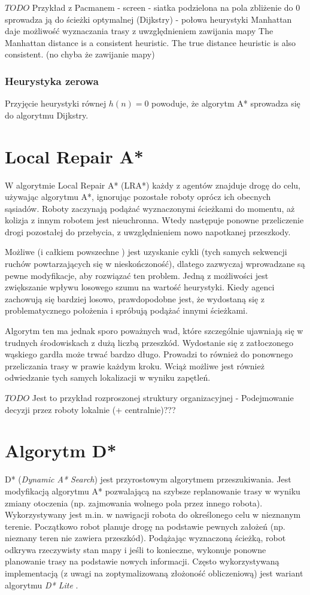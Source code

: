 $TODO$ Przykład z Pacmanem - screen - siatka podzielona na pola
zbliżenie do 0 sprowadza ją do ścieżki optymalnej (Dijkstry) - połowa heurystyki Manhattan daje możliwość wyznaczania trasy z uwzględnieniem zawijania mapy
The Manhattan distance is a consistent heuristic. The true distance heuristic is also consistent. (no chyba że zawijanie mapy)

\subsubsection{Heurystyka zerowa}
Przyjęcie heurystyki równej $h(n) = 0$ powoduje, że algorytm A* sprowadza się do algorytmu Dijkstry.

\section{Local Repair A*}
\label{ch:lra}
W algorytmie Local Repair A* (LRA*) każdy z agentów znajduje drogę do celu, używając algorytmu A*, ignorując pozostałe roboty oprócz ich obecnych sąsiadów. Roboty zaczynają podążać wyznaczonymi ścieżkami do momentu, aż kolizja z innym robotem jest nieuchronna. Wtedy następuje ponowne przeliczenie drogi pozostałej do przebycia, z uwzględnieniem nowo napotkanej przeszkody.

Możliwe (i całkiem powszechne \cite{cooppath}) jest uzyskanie cykli (tych samych sekwencji ruchów powtarzających się w nieskończoność), dlatego zazwyczaj wprowadzane są pewne modyfikacje, aby rozwiązać ten problem. Jedną z możliwości jest zwiększanie wpływu losowego szumu na wartość heurystyki. Kiedy agenci zachowują się bardziej losowo, prawdopodobne jest, że wydostaną się z problematycznego położenia i spróbują podążać innymi ścieżkami.

Algorytm ten ma jednak sporo poważnych wad, które szczególnie ujawniają się w trudnych środowiskach z dużą liczbą przeszkód. Wydostanie się z zatłoczonego wąskiego gardła może trwać bardzo długo. Prowadzi to również do ponownego przeliczania trasy w prawie każdym kroku. Wciąż możliwe jest również odwiedzanie tych samych lokalizacji w wyniku zapętleń.

$TODO$ Jest to przykład rozproszonej struktury organizacyjnej - Podejmowanie decyzji przez roboty lokalnie (+ centralnie)???

\section{Algorytm D*}
\label{ch:dstar}
D* ({\it Dynamic A* Search}) jest przyrostowym algorytmem przeszukiwania. Jest modyfikacją algorytmu A* pozwalającą na szybsze replanowanie trasy w wyniku zmiany otoczenia (np. zajmowania wolnego pola przez innego robota). Wykorzystywany jest m.in. w nawigacji robota do określonego celu w nieznanym terenie. Początkowo robot planuje drogę na podstawie pewnych założeń (np. nieznany teren nie zawiera przeszkód). Podążając wyznaczoną ścieżką, robot odkrywa rzeczywisty stan mapy i jeśli to konieczne, wykonuje ponowne planowanie trasy na podstawie nowych informacji.
Często wykorzystywaną implementacją (z uwagi na zoptymalizowaną złożoność obliczeniową) jest wariant algorytmu {\it D* Lite} \cite{dstarlite}.

